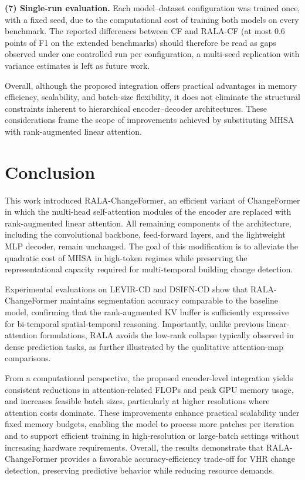 \documentclass[runningheads]{llncs}
\newcommand{\journal}[1]{{\color{orange}#1}}
\begin{document}
\journal{\noindent \textbf{(7) Single-run evaluation.}
Each model--dataset configuration was trained once, with a fixed seed, due to
the computational cost of training both models on every benchmark. The
reported differences between CF and RALA-CF (at most 0.6 points of F1 on the
extended benchmarks) should therefore be read as gaps observed under one
controlled run per configuration, a multi-seed replication with variance
estimates is left as future work.}

\medskip
\noindent  Overall, although the proposed integration offers practical
advantages in memory efficiency, scalability, and batch-size flexibility, it
does not eliminate the structural constraints inherent to hierarchical
encoder--decoder architectures. These considerations frame the scope of
improvements achieved by substituting MHSA with rank-augmented linear attention.

\section{Conclusion}
\label{sec:conclusion}

This work introduced RALA-ChangeFormer, an efficient variant of
ChangeFormer in which the multi-head self-attention modules of the
encoder are replaced with rank-augmented linear attention. All
remaining components of the architecture, including the convolutional backbone,
feed-forward layers, and the lightweight MLP decoder, remain unchanged. The
goal of this modification is to alleviate the quadratic cost of MHSA in
high-token regimes while preserving the representational capacity required for
multi-temporal building change detection.

Experimental evaluations on LEVIR-CD and DSIFN-CD show that RALA-ChangeFormer
maintains segmentation accuracy comparable to the baseline model, confirming
that the rank-augmented KV buffer is sufficiently expressive for bi-temporal
spatial-temporal reasoning. Importantly, unlike previous linear-attention
formulations, RALA avoids the low-rank collapse typically observed in dense
prediction tasks, as further illustrated by the qualitative attention-map
comparisons.

From a computational perspective, the proposed encoder-level integration yields
consistent reductions in attention-related FLOPs and peak GPU memory usage, and
increases feasible batch sizes, particularly at higher resolutions where
attention costs dominate. These improvements enhance practical scalability under
fixed memory budgets, enabling the model to process more patches per iteration
and to support efficient training in high-resolution or large-batch settings
without increasing hardware requirements. Overall, the results demonstrate that
RALA-ChangeFormer provides a favorable accuracy-efficiency trade-off for VHR
change detection, preserving predictive behavior while reducing resource
demands.
\end{document}
